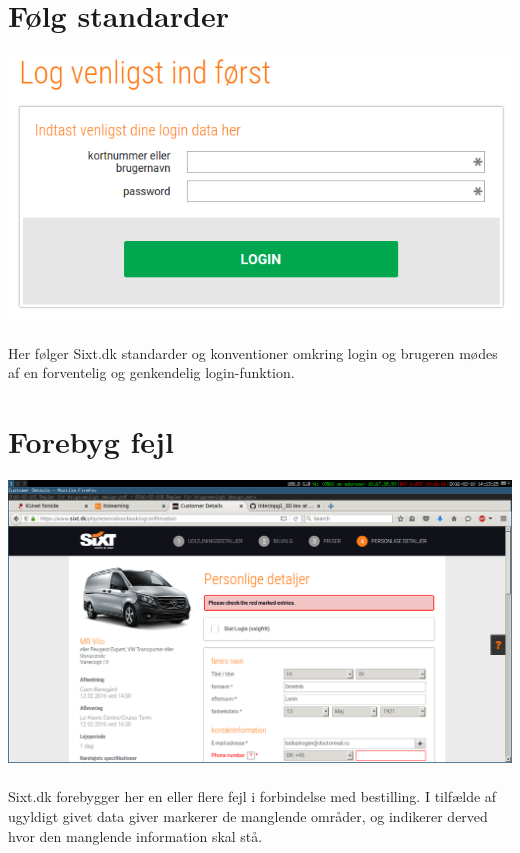 \documentclass[12pt]{article}
\begin{document}
\section{Følg standarder}
\includegraphics[scale=0.5]{img/standard}
\\
\\
Her følger Sixt.dk standarder og konventioner omkring login og brugeren mødes af en forventelig og genkendelig login-funktion.

\newpage

\section{Forebyg fejl}
\includegraphics[scale=0.3]{img/CheckRedMarks}
\\
\\
Sixt.dk forebygger her en eller flere fejl i forbindelse med bestilling. I tilfælde af ugyldigt givet data giver markerer de manglende områder, og indikerer derved hvor den manglende information skal stå.
\\
\\
\end{document}
